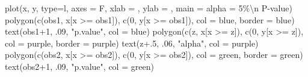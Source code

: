 \documentclass[
  letterpaper,
  DIV=11,
  numbers=noendperiod]{scrreprt}
\newenvironment{Shaded}{\begin{snugshade}}{\end{snugshade}}
\newcommand{\AttributeTok}[1]{\textcolor[rgb]{0.40,0.45,0.13}{#1}}
\newcommand{\DecValTok}[1]{\textcolor[rgb]{0.68,0.00,0.00}{#1}}
\newcommand{\FloatTok}[1]{\textcolor[rgb]{0.68,0.00,0.00}{#1}}
\newcommand{\FunctionTok}[1]{\textcolor[rgb]{0.28,0.35,0.67}{#1}}
\newcommand{\NormalTok}[1]{\textcolor[rgb]{0.00,0.23,0.31}{#1}}
\newcommand{\SpecialCharTok}[1]{\textcolor[rgb]{0.37,0.37,0.37}{#1}}
\newcommand{\StringTok}[1]{\textcolor[rgb]{0.13,0.47,0.30}{#1}}
\begin{document}
\begin{Shaded}
\begin{Highlighting}[]
\FunctionTok{plot}\NormalTok{(x, y, }\AttributeTok{type=}\StringTok{\textquotesingle{}l\textquotesingle{}}\NormalTok{, }\AttributeTok{axes =}\NormalTok{ F, }\AttributeTok{xlab =} \StringTok{\textquotesingle{}\textquotesingle{}}\NormalTok{, }\AttributeTok{ylab =} \StringTok{\textquotesingle{}\textquotesingle{}}\NormalTok{,}
     \AttributeTok{main =} \StringTok{\textquotesingle{}alpha = 5\%}\SpecialCharTok{\textbackslash{}n}\StringTok{ P{-}value\textquotesingle{}}\NormalTok{)}
\FunctionTok{polygon}\NormalTok{(}\FunctionTok{c}\NormalTok{(obs1, x[x }\SpecialCharTok{\textgreater{}=}\NormalTok{ obs1]), }\FunctionTok{c}\NormalTok{(}\DecValTok{0}\NormalTok{, y[x }\SpecialCharTok{\textgreater{}=}\NormalTok{ obs1]), }\AttributeTok{col =} \StringTok{\textquotesingle{}blue\textquotesingle{}}\NormalTok{, }\AttributeTok{border =} \StringTok{\textquotesingle{}blue\textquotesingle{}}\NormalTok{)}
\FunctionTok{text}\NormalTok{(obs1}\SpecialCharTok{+}\DecValTok{1}\NormalTok{, .}\DecValTok{09}\NormalTok{, }\StringTok{"p.value"}\NormalTok{, }\AttributeTok{col =} \StringTok{\textquotesingle{}blue\textquotesingle{}}\NormalTok{)}
\FunctionTok{polygon}\NormalTok{(}\FunctionTok{c}\NormalTok{(z, x[x }\SpecialCharTok{\textgreater{}=}\NormalTok{ z]), }\FunctionTok{c}\NormalTok{(}\DecValTok{0}\NormalTok{, y[x }\SpecialCharTok{\textgreater{}=}\NormalTok{ z]), }\AttributeTok{col =} \StringTok{\textquotesingle{}purple\textquotesingle{}}\NormalTok{, }\AttributeTok{border =} \StringTok{\textquotesingle{}purple\textquotesingle{}}\NormalTok{)}
\FunctionTok{text}\NormalTok{(z}\FloatTok{+.5}\NormalTok{, .}\DecValTok{06}\NormalTok{, }\StringTok{"alpha"}\NormalTok{, }\AttributeTok{col =} \StringTok{\textquotesingle{}purple\textquotesingle{}}\NormalTok{)}
\FunctionTok{polygon}\NormalTok{(}\FunctionTok{c}\NormalTok{(obs2, x[x }\SpecialCharTok{\textgreater{}=}\NormalTok{ obs2]), }\FunctionTok{c}\NormalTok{(}\DecValTok{0}\NormalTok{, y[x }\SpecialCharTok{\textgreater{}=}\NormalTok{ obs2]), }\AttributeTok{col =} \StringTok{\textquotesingle{}green\textquotesingle{}}\NormalTok{, }\AttributeTok{border =} \StringTok{\textquotesingle{}green\textquotesingle{}}\NormalTok{)}
\FunctionTok{text}\NormalTok{(obs2}\SpecialCharTok{+}\DecValTok{1}\NormalTok{, .}\DecValTok{09}\NormalTok{, }\StringTok{"p.value"}\NormalTok{, }\AttributeTok{col =} \StringTok{\textquotesingle{}green\textquotesingle{}}\NormalTok{)}
\end{Highlighting}
\end{Shaded}
\end{document}
